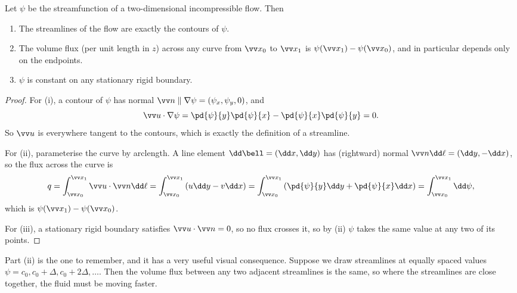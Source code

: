 \begin{proposition}
	Let $\psi$ be the streamfunction of a two-dimensional incompressible flow. Then
	\begin{enumerate}[label=(\roman*)]
		\item The streamlines of the flow are exactly the contours of $\psi$.
		\item The volume flux (per unit length in $z$) across any curve from $\vv x_0$ to $\vv x_1$ is $\psi(\vv x_1) - \psi(\vv x_0)$, and in particular depends only on the endpoints.
		\item $\psi$ is constant on any stationary rigid boundary.
	\end{enumerate}
\end{proposition}
\begin{proof}
	For (i), a contour of $\psi$ has normal $\vv n \parallel \nabla \psi = (\psi_x, \psi_y, 0)$, and
	$$
	\vv u \cdot \nabla \psi = \pd{\psi}{y}\pd{\psi}{x} - \pd{\psi}{x}\pd{\psi}{y} = 0.
	$$
	So $\vv u$ is everywhere tangent to the contours, which is exactly the definition of a streamline.

	For (ii), parameterise the curve by arclength. A line element $\dd \bell = (\dd x, \dd y)$ has (rightward) normal $\vv n \dd \ell = (\dd y, -\dd x)$, so the flux across the curve is
	$$
	q = \int_{\vv x_0}^{\vv x_1} \vv u \cdot \vv n \dd \ell = \int_{\vv x_0}^{\vv x_1} \left(u \dd y - v \dd x\right) = \int_{\vv x_0}^{\vv x_1}\left(\pd{\psi}{y}\dd y + \pd{\psi}{x}\dd x \right)= \int_{\vv x_0}^{\vv x_1} \dd \psi,
	$$
	which is $\psi(\vv x_1) - \psi(\vv x_0)$.

	For (iii), a stationary rigid boundary satisfies $\vv u \cdot \vv n = 0$, so no flux crosses it, so by (ii) $\psi$ takes the same value at any two of its points. \qedhere
\end{proof}

Part (ii) is the one to remember, and it has a very useful visual consequence. Suppose we draw streamlines at equally spaced values $\psi = c_0, c_0 + \Delta, c_0 + 2\Delta, \dots$. Then the volume flux between any two adjacent streamlines is the same, so where the streamlines are close together, the fluid must be moving faster.

\begin{center}
\end{center}

